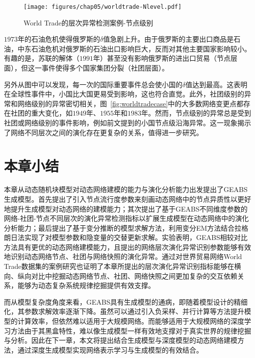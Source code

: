 \begin{figure}
	\centering
	\texttt{[image: figures/chap05/worldtrade-Nlevel.pdf]}
	\caption{World Trade的层次异常检测案例-节点级别}
	\label{fig:worldtradecaseN}
\end{figure}
$1973$年的石油危机使得俄罗斯的$\delta$值急剧上升。由于俄罗斯的主要出口商品是石油，中东石油危机对俄罗斯的石油出口影响巨大，反而对其他主要国家影响较小。有趣的是，苏联的解体（$1991$年）甚至没有影响俄罗斯的进出口贸易（节点层面），但这一事件使得多个国家集团分裂（社团层面）。

另外从图中可以发现，每一次的国际重要事件总会使小国的$\delta$值达到最高。这表明在全球性事件中，小国比大国更易受到影响，这也符合直觉。此外，社团级别的异常和网络级别的异常密切相关，图~\ref{fig:worldtradecase}中的大多数网络变更点都存在社团的重大变化，如$1949$年、$1955$年和$1983$年。然而，节点级别的异常总是受到社团或网络级别的事件影响，例如前文提到的小国节点级沿海异常。这一现象揭示了网络不同层次之间的演化存在更复杂的关系，值得进一步研究。



\section{本章小结\label{chap4:summary}}

本章从动态随机块模型对动态网络建模的能力与演化分析能力出发提出了GEABS生成模型。首先提出了引入节点流行度参数来刻画动态网络中的节点异质性以更好地提升生成模型对动态网络的建模能力；其次提出了基于GEABS不同维度参数的网络-社团-节点不同层次的演化异常检测指标以扩展生成模型在动态网络中的演化分析能力；最后提出了基于变分推断的模型求解方法，利用变分EM方法结合拉格朗日法实现了对模型参数和隐变量的交替更新求解。实验表明，GEABS相较对比方法具有更优的动态网络建模能力，且提出的网络层次演化异常识别参数能够有效地识别动态网络节点、社团与网络快照的演化异常。通过对世界贸易网络World Trade数据集的案例研究也证明了本章所提出的层次演化异常识别指标能够在横向、纵向对比中挖掘动态网络节点、社团、网络快照之间更加复杂的交互依赖关系，能够为动态复杂系统规律挖掘提供有效支撑。

而从模型复杂度角度来看，GEABS具有生成模型的通病，即随着模型设计的精细化，其参数求解效率逐渐下降。虽然可以通过引入负采样、并行计算等方法提升模型的计算效率，但依然难以适用于大规模网络。而能够适用于大规模网络的深度学习方法由于其黑盒特性，难以像生成模型一样有效地支撑对于真实世界的规律挖掘与分析。因此在下一章，本文将提出结合生成模型与深度模型的动态网络建模方法，通过深度生成模型实现网络表示学习与生成模型的有效结合。